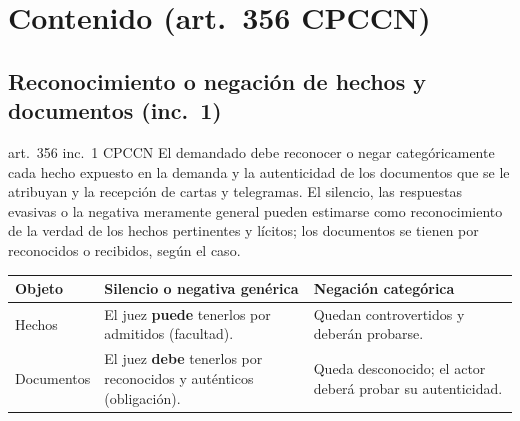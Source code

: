 \documentclass[12pt,oneside]{book}
\renewcommand{\arraystretch}{1.15}
\begin{document}
\section{Contenido (art.~356 CPCCN)}

\subsection{Reconocimiento o negación de hechos y documentos (inc.~1)}

\begin{regla}{art.~356 inc.~1 CPCCN}
El demandado debe reconocer o negar categóricamente cada hecho expuesto en la demanda y la autenticidad de los documentos que se le atribuyan y la recepción de cartas y telegramas. El silencio, las respuestas evasivas o la negativa meramente general pueden estimarse como reconocimiento de la verdad de los hechos pertinentes y lícitos; los documentos se tienen por reconocidos o recibidos, según el caso.
\end{regla}

\begin{table}[H]
\centering
\renewcommand{\arraystretch}{1.25}
\begin{tabularx}{\textwidth}{>{\RaggedRight\arraybackslash}p{}>{\RaggedRight\arraybackslash}X>{\RaggedRight\arraybackslash}X}
\toprule
\textbf{Objeto} & \textbf{Silencio o negativa genérica} & \textbf{Negación categórica} \\
\midrule
Hechos & El juez \textbf{puede} tenerlos por admitidos (facultad). & Quedan controvertidos y deberán probarse. \\
Documentos & El juez \textbf{debe} tenerlos por reconocidos y auténticos (obligación). & Queda desconocido; el actor deberá probar su autenticidad. \\
\bottomrule
\end{tabularx}
\end{table}
\end{document}
